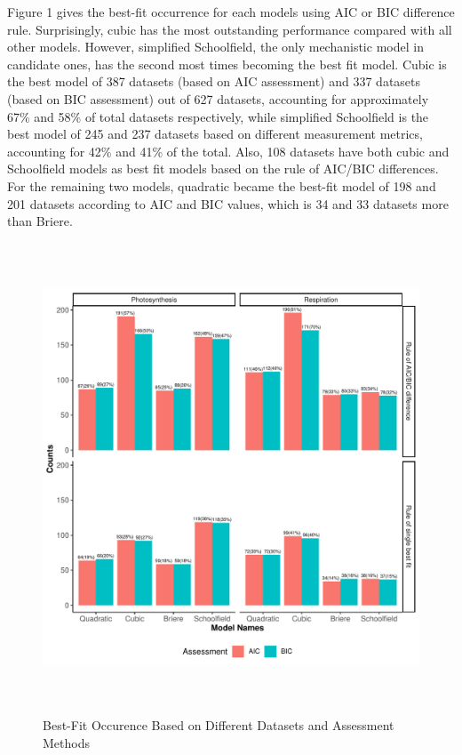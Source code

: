 \documentclass[11pt]{article}
\begin{document}
Figure 1 gives the best-fit occurrence for each models using AIC or BIC difference rule. Surprisingly, cubic has the most outstanding performance compared with all other models. However, simplified Schoolfield, the only mechanistic model in candidate ones, has the second most times becoming the best fit model. Cubic is the best model of 387 datasets (based on AIC assessment) and 337 datasets (based on BIC assessment) out of 627 datasets, accounting for approximately 67\% and 58\% of total datasets respectively, while simplified Schoolfield is the best model of 245 and 237 datasets based on different measurement metrics, accounting for 42\% and 41\% of the total. Also, 108 datasets have both cubic and Schoolfield models as best fit models based on the rule of AIC/BIC differences. For the remaining two models, quadratic became the best-fit model of 198 and 201 datasets according to AIC and BIC values, which is 34 and 33 datasets more than Briere. 

\begin{figure}[H]
    \center
    \includegraphics[height = 14cm, width = 15cm]{images/bestfit_grouped_rule2.pdf}
    \caption{Best-Fit Occurence Based on Different Datasets and Assessment Methods}
\end{figure}
\end{document}
